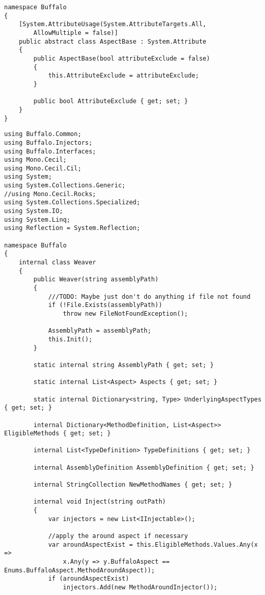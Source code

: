 \begin{lstlisting}[caption={../buffalo/AspectBase.cs}, label=../buffalo/AspectBase.cs, frame=tb, basicstyle=\scriptsize]﻿namespace Buffalo
{
    [System.AttributeUsage(System.AttributeTargets.All,
        AllowMultiple = false)]
    public abstract class AspectBase : System.Attribute
    {
        public AspectBase(bool attributeExclude = false)
        {
            this.AttributeExclude = attributeExclude;
        }

        public bool AttributeExclude { get; set; }
    }
}
\end{lstlisting}

\begin{lstlisting}[caption={../buffalo/Weaver.cs}, label=../buffalo/Weaver.cs, frame=tb, basicstyle=\scriptsize]﻿using Buffalo.Common;
using Buffalo.Injectors;
using Buffalo.Interfaces;
using Mono.Cecil;
using Mono.Cecil.Cil;
using System;
using System.Collections.Generic;
//using Mono.Cecil.Rocks;
using System.Collections.Specialized;
using System.IO;
using System.Linq;
using Reflection = System.Reflection;

namespace Buffalo
{
    internal class Weaver
    {
        public Weaver(string assemblyPath)
        {
            ///TODO: Maybe just don't do anything if file not found
            if (!File.Exists(assemblyPath))
                throw new FileNotFoundException();

            AssemblyPath = assemblyPath;
            this.Init();
        }

        static internal string AssemblyPath { get; set; }

        static internal List<Aspect> Aspects { get; set; }

        static internal Dictionary<string, Type> UnderlyingAspectTypes { get; set; }

        internal Dictionary<MethodDefinition, List<Aspect>> EligibleMethods { get; set; }

        internal List<TypeDefinition> TypeDefinitions { get; set; }

        internal AssemblyDefinition AssemblyDefinition { get; set; }

        internal StringCollection NewMethodNames { get; set; }

        internal void Inject(string outPath)
        {
            var injectors = new List<IInjectable>();

            //apply the around aspect if necessary
            var aroundAspectExist = this.EligibleMethods.Values.Any(x => 
                x.Any(y => y.BuffaloAspect == Enums.BuffaloAspect.MethodAroundAspect));
            if (aroundAspectExist)
                injectors.Add(new MethodAroundInjector());


\end{lstlisting}
